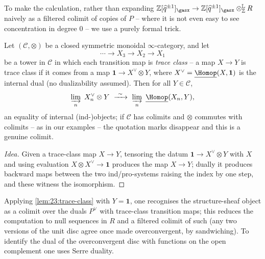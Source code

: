 To make the calculation, rather than expanding
$\mathbb Z[\widehat q^{\pm1}]_\gasx\to\mathbb Z[\widehat q^{\pm1}]_\gasx
\otimes^{\mathbb L}_{\mathbb Z}R$ naively as a filtered colimit of copies of
$P$ -- where it is not even easy to see concentration in degree $0$ -- we use a
purely formal trick.

\begin{lemma}
\label{lem:23:trace-class}
Let $(\mathcal C,\otimes)$ be a closed symmetric monoidal $\infty$-category, and
let
\begin{equation*}
\cdots\to X_3\to X_2\to X_1
\end{equation*}
be a tower in $\mathcal C$ in which each transition map is \emph{trace class} --
a map $X\to Y$ is trace class if it comes from a map
$\mathbf 1\to X^\vee\otimes Y$, where $X^\vee=\underline{\Homop}(X,\mathbf 1)$ is
the internal dual (no dualizability assumed). Then for all $Y\in\mathcal C$,
\begin{equation*}
\varinjlim_n\ X_n^\vee\otimes Y\ \xrightarrow{\ \sim\ }\
\varinjlim_n\ \underline{\Homop}(X_n,Y),
\end{equation*}
an equality of internal (ind-)objects; if $\mathcal C$ has colimits and $\otimes$
commutes with colimits -- as in our examples -- the quotation marks disappear
and this is a genuine colimit.
\end{lemma}

\begin{proof}[Idea]
Given a trace-class map $X\to Y$, tensoring the datum $\mathbf 1\to X^\vee\otimes
Y$ with $X$ and using evaluation $X\otimes X^\vee\to\mathbf 1$ produces the map
$X\to Y$; dually it produces backward maps between the two ind/pro-systems
raising the index by one step, and these witness the isomorphism.
\end{proof}

Applying \cref{lem:23:trace-class} with $Y=\mathbf 1$, one recognises the
structure-sheaf object as a colimit over the duals $P^\vee$ with trace-class
transition maps; this reduces the computation to null sequences in $R$ and a
filtered colimit of such (any two versions of the unit disc agree once made
overconvergent, by sandwiching). To identify the dual of the overconvergent disc
with functions on the open complement one uses Serre duality.

